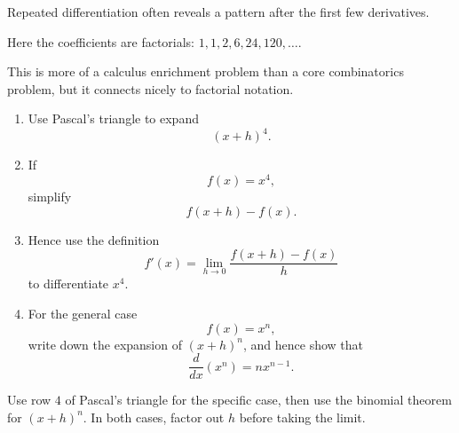 \begin{takeaways}
\item Repeated differentiation often reveals a pattern after the first few derivatives.
\item Here the coefficients are factorials: $1,1,2,6,24,120,\dots$.
\item This is more of a calculus enrichment problem than a core combinatorics problem, but it connects nicely to factorial notation.
\end{takeaways}

\begin{problem}
\begin{enumerate}[label=\roman*)]
\item Use Pascal's triangle to expand
\[
(x+h)^4.
\]

\item If
\[
f(x)=x^4,
\]
simplify
\[
f(x+h)-f(x).
\]

\item Hence use the definition
\[
f'(x)=\lim_{h\to 0}\frac{f(x+h)-f(x)}{h}
\]
to differentiate $x^4$.

\item For the general case
\[
f(x)=x^n,
\]
write down the expansion of $(x+h)^n$, and hence show that
\[
\frac{d}{dx}(x^n)=nx^{n-1}.
\]
\end{enumerate}
\end{problem}

\begin{hint}
Use row $4$ of Pascal's triangle for the specific case, then use the binomial theorem for $(x+h)^n$. In both cases, factor out $h$ before taking the limit.
\end{hint}

